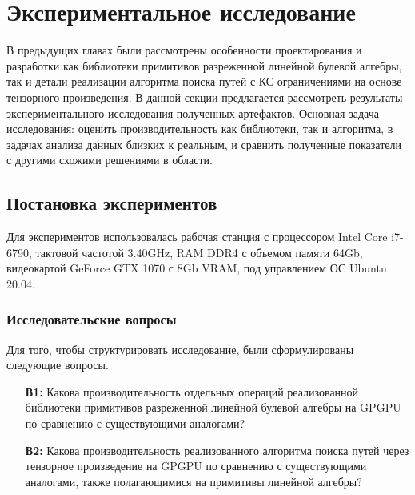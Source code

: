 \section{Экспериментальное исследование}

В предыдущих главах были рассмотрены особенности проектирования и разработки как библиотеки примитивов разреженной линейной булевой алгебры, 
так и детали реализации алгоритма поиска путей с КС ограничениями на основе тензорного произведения.
В данной секции предлагается рассмотреть результаты экспериментального исследования полученных артефактов.
Основная задача исследования: оценить производительность как библиотеки, так и алгоритма, в задачах анализа данных близких к реальным, и сравнить полученные показатели с другими схожими решениями в области.

\subsection{Постановка экспериментов}

Для экспериментов использовалась рабочая станция с процессором Intel Core i7-6790, тактовой частотой 3.40GHz, RAM DDR4 с объемом памяти 64Gb, видеокартой GeForce GTX 1070 с 8Gb VRAM, под управлением ОС Ubuntu 20.04.

\subsubsection*{Исследовательские вопросы}

Для того, чтобы структурировать исследование, были сформулированы следующие вопросы.

\begin{itemize}
   \item[\textbf{В1:}] Какова производительность отдельных операций реализованной библиотеки примитивов разреженной линейной булевой алгебры на GPGPU по сравнению с существующими аналогами?
   
   \item[\textbf{В2:}] Какова производительность реализованного алгоритма поиска путей через тензорное произведение на GPGPU  по сравнению с существующими аналогами, также полагающимися на примитивы линейной алгебры? 
\end{itemize}

